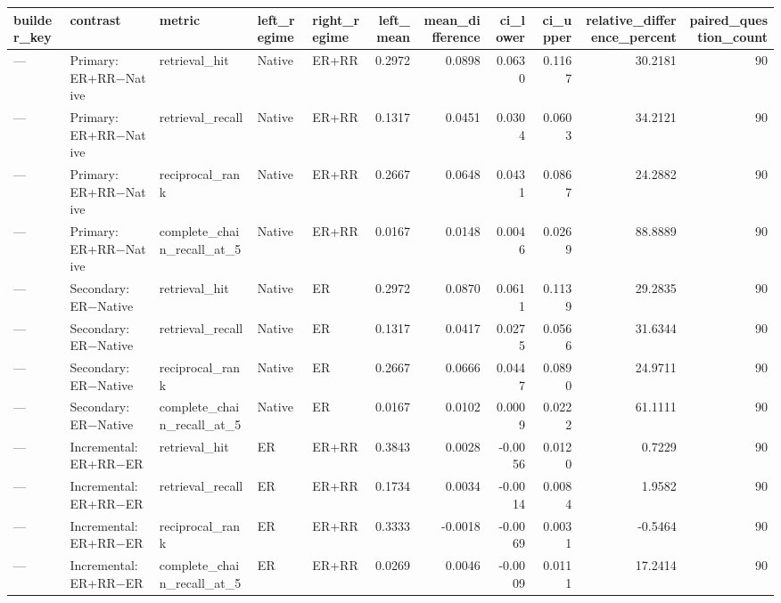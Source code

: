 \begin{tabular}{lllllrrrrrr}
\toprule
builder_key & contrast & metric & left_regime & right_regime & left_mean & mean_difference & ci_lower & ci_upper & relative_difference_percent & paired_question_count \\
\midrule
— & Primary: ER+RR−Native & retrieval_hit & Native & ER+RR & 0.2972 & 0.0898 & 0.0630 & 0.1167 & 30.2181 & 90 \\
— & Primary: ER+RR−Native & retrieval_recall & Native & ER+RR & 0.1317 & 0.0451 & 0.0304 & 0.0603 & 34.2121 & 90 \\
— & Primary: ER+RR−Native & reciprocal_rank & Native & ER+RR & 0.2667 & 0.0648 & 0.0431 & 0.0867 & 24.2882 & 90 \\
— & Primary: ER+RR−Native & complete_chain_recall_at_5 & Native & ER+RR & 0.0167 & 0.0148 & 0.0046 & 0.0269 & 88.8889 & 90 \\
— & Secondary: ER−Native & retrieval_hit & Native & ER & 0.2972 & 0.0870 & 0.0611 & 0.1139 & 29.2835 & 90 \\
— & Secondary: ER−Native & retrieval_recall & Native & ER & 0.1317 & 0.0417 & 0.0275 & 0.0566 & 31.6344 & 90 \\
— & Secondary: ER−Native & reciprocal_rank & Native & ER & 0.2667 & 0.0666 & 0.0447 & 0.0890 & 24.9711 & 90 \\
— & Secondary: ER−Native & complete_chain_recall_at_5 & Native & ER & 0.0167 & 0.0102 & 0.0009 & 0.0222 & 61.1111 & 90 \\
— & Incremental: ER+RR−ER & retrieval_hit & ER & ER+RR & 0.3843 & 0.0028 & -0.0056 & 0.0120 & 0.7229 & 90 \\
— & Incremental: ER+RR−ER & retrieval_recall & ER & ER+RR & 0.1734 & 0.0034 & -0.0014 & 0.0084 & 1.9582 & 90 \\
— & Incremental: ER+RR−ER & reciprocal_rank & ER & ER+RR & 0.3333 & -0.0018 & -0.0069 & 0.0031 & -0.5464 & 90 \\
— & Incremental: ER+RR−ER & complete_chain_recall_at_5 & ER & ER+RR & 0.0269 & 0.0046 & -0.0009 & 0.0111 & 17.2414 & 90 \\
\bottomrule
\end{tabular}
